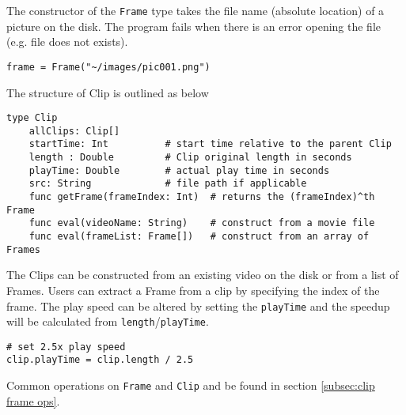 \documentclass[11pt]{article}
\begin{document}
The constructor of the \texttt{Frame} type takes the file name (absolute location) of a picture on the disk. The program fails when there is an error opening the file (e.g. file does not exists).

\begin{lstlisting}
frame = Frame("~/images/pic001.png")
\end{lstlisting}

The structure of Clip is outlined as below
\begin{lstlisting}
type Clip
    allClips: Clip[]
    startTime: Int 			# start time relative to the parent Clip
    length : Double 		# Clip original length in seconds
    playTime: Double 		# actual play time in seconds
    src: String 			# file path if applicable
    func getFrame(frameIndex: Int) 	# returns the (frameIndex)^th Frame
    func eval(videoName: String) 	# construct from a movie file
    func eval(frameList: Frame[]) 	# construct from an array of Frames
\end{lstlisting}

The Clips can be constructed from an existing video on the disk or from a list of Frames. Users can extract a Frame from a clip by specifying the index of the frame. The play speed can be altered by setting the \texttt{playTime} and the speedup will be calculated from  \texttt{length}/\texttt{playTime}.

\begin{lstlisting}
# set 2.5x play speed
clip.playTime = clip.length / 2.5
\end{lstlisting}

Common operations on \texttt{Frame} and \texttt{Clip} and be found in section \ref{subsec:clip frame ops}.
\end{document}
